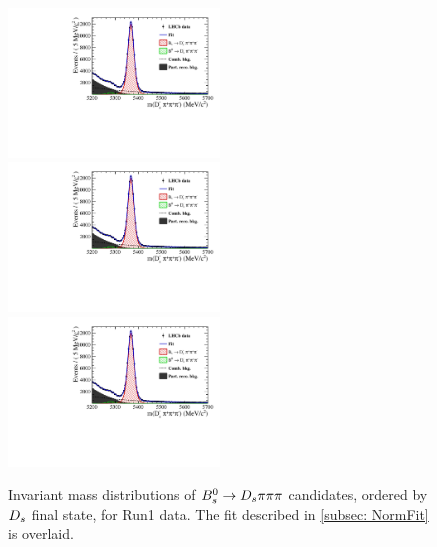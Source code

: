 \begin{figure}[h]
\includegraphics[height=!,width=0.5\textwidth]{figs/MassFit/norm_y12_KsK.pdf}
\includegraphics[height=!,width=0.5\textwidth]{figs/MassFit/norm_y12_KKpi_NR.pdf}
\includegraphics[height=!,width=0.5\textwidth]{figs/MassFit/norm_y12_pipipi.pdf}
\caption{Invariant mass distributions of ${{B}^0_{s}}\rightarrow{\ensuremath{{D}_{s}}}{\ensuremath{\pi}}{\ensuremath{\pi}}{\ensuremath{\pi}}$ candidates, ordered by ${{D}_{s}}$ final state, for Run1 data.
The fit described in \ref{subsec: NormFit} is overlaid.}
\label{fig:massfits_norm_Run1}
\end{figure}

\clearpage


